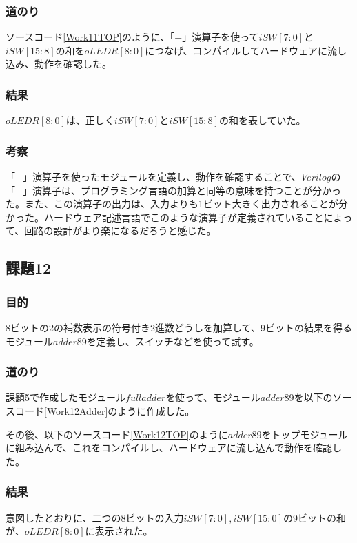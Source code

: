 \documentclass[a4paper]{jarticle}
\begin{document}
\subsubsection{道のり}
ソースコード\ref{Work11TOP}のように、「+」演算子を使って$iSW \left[ 7:0 \right]$と$iSW \left[ 15:8 \right]$の和を$oLEDR \left[ 8:0 \right]$につなげ、コンパイルしてハードウェアに流し込み、動作を確認した。

\subsubsection{結果}
$oLEDR \left[ 8:0 \right]$は、正しく$iSW \left[ 7:0 \right]$と$iSW \left[ 15:8 \right]$の和を表していた。
\subsubsection{考察}
「+」演算子を使ったモジュールを定義し、動作を確認することで、$Verilog$の「+」演算子は、プログラミング言語の加算と同等の意味を持つことが分かった。また、この演算子の出力は、入力よりも1ビット大きく出力されることが分かった。ハードウェア記述言語でこのような演算子が定義されていることによって、回路の設計がより楽になるだろうと感じた。
\subsection{課題12}
\subsubsection{目的}
8ビットの2の補数表示の符号付き2進数どうしを加算して、9ビットの結果を得るモジュール$adder89$を定義し、スイッチなどを使って試す。
\subsubsection{道のり}
課題5で作成したモジュール$fulladder$を使って、モジュール$adder89$を以下のソースコード\ref{Work12Adder}のように作成した。

その後、以下のソースコード\ref{Work12TOP}のように$adder89$をトップモジュールに組み込んで、これをコンパイルし、ハードウェアに流し込んで動作を確認した。

\subsubsection{結果}
意図したとおりに、二つの8ビットの入力$iSW[7:0],iSW[15:0]$の9ビットの和が、$oLEDR[8:0]$に表示された。
\end{document}
